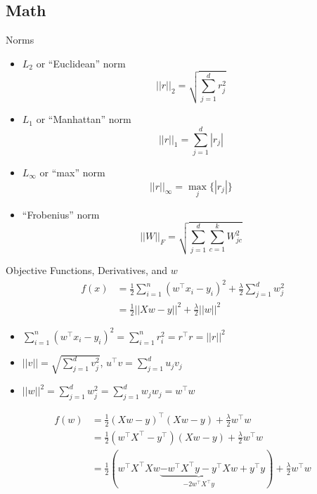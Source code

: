 \documentclass[10pt,landscape,a4paper]{article}
\begin{document}
\begin{multicols*}{5}
\section{Math}
Norms
\begin{itemize}
    \item \(L_2\) or ``Euclidean'' norm
    \begin{equation*}
         ||r||_2 = \sqrt{\sum_{j=1}^{d} r_j^2}
    \end{equation*}
    \item \(L_1\) or ``Manhattan'' norm
    \begin{equation*}
        ||r||_1 = \sum_{j=1}^{d} |r_j|
    \end{equation*}
    \item \(L_{\infty}\) or ``max'' norm
    \begin{equation*}
        ||r||_{\infty} = \max_j{\{|r_j|}\}
    \end{equation*}
    \item ``Frobenius'' norm
    \begin{equation*}
        ||W||_F = \sqrt{\sum_{j=1}^{d} \sum_{c=1}^{k} W_{jc}^2}
    \end{equation*}
\end{itemize}
Objective Functions, Derivatives, and \(w\)
\begin{align*}
   f(x) &= \frac{1}{2}\sum\limits_{i=1}^{n} (w^\intercal x_i - y_i)^2 + \frac{\lambda}{2} \sum\limits_{j=1}^{d} w_j^2 \\
   &= \frac{1}{2} ||Xw-y||^2 + \frac{\lambda}{2} ||w||^2
\end{align*}
\begin{itemize}
    \item \(\sum\limits_{i=1}^{n} (w^\intercal x_i - y_i)^2 = \sum\limits_{i=1}^{n} r_i^2 = r^\intercal r = ||r||^2\)
    \item \(||v|| = \sqrt{\sum\limits_{j=1}^{d} v_j^2}\), \(u^\intercal v = \sum\limits_{j=1}^{d} u_j v_j\)
    \item \(||w||^2 = \sum\limits_{j=1}^{d} w_j^2 = \sum\limits_{j=1}^{d} w_j w_j = w^\intercal w \)
\end{itemize}
\begin{align*}
    f(w) &= \frac{1}{2} (Xw-y)^\intercal (Xw-y) + \frac{\lambda}{2} w^\intercal w \\
    &= \frac{1}{2} (w^\intercal X^\intercal - y^\intercal)(Xw-y) + \frac{\lambda}{2} w^\intercal w \\
    &= \frac{1}{2} (w^\intercal X^\intercal X w \underbrace{-w^\intercal X^\intercal y - y^\intercal X w}_{-2w^\intercal X^\intercal y} + y^\intercal y) + \frac{\lambda}{2} w^\intercal w \\

\end{align*}
\end{multicols*}
\end{document}
